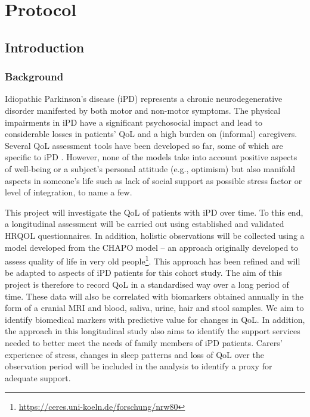 \chapter{Protocol}
\section{Introduction}
\subsection{Background}
Idiopathic Parkinson's disease (\acs{iPD}) represents a chronic neurodegenerative disorder manifested by both motor and non-motor symptoms. The physical impairments in \ac{iPD} have a significant psychosocial impact and lead to considerable losses in patients'  \ac{QoL} and a high burden on (informal) caregivers. Several \ac{QoL} assessment tools have been developed so far, some of which are specific to \ac{iPD} \cite{stuhrenberg2022jpm}. However, none of the models take into account positive aspects of well-being or a subject's personal attitude (e.g., optimism) but also manifold aspects in someone's life such as lack of social support as possible stress factor or level of integration, to name a few.

This project will investigate the \ac{QoL} of patients with \ac{iPD} over time. To this end, a longitudinal assessment will be carried out using established and validated \ac{HRQOL} questionnaires. In addition, holistic observations will be collected using a model developed from the \textsc{CHAPO} model \citep{thieken2022jpd} -- an approach originally developed to assess quality of life in very old people\footnote{\url{https://ceres.uni-koeln.de/forschung/nrw80}}. This approach has been refined and will be adapted to aspects of \ac{iPD} patients for this cohort study. The aim of this project is therefore to record \ac{QoL} in a standardised way over a long period of time. These data will also be correlated with biomarkers obtained annually in the form of a cranial \ac{MRI} and blood, saliva, urine, hair and stool samples. We aim to identify biomedical markers with predictive value for changes in \ac{QoL}. In addition, the approach in this longitudinal study also aims to identify the support services needed to better meet the needs of family members of \ac{iPD} patients. Carers' experience of stress, changes in sleep patterns and loss of \ac{QoL} over the observation period will be included in the analysis to identify a proxy for adequate support.

